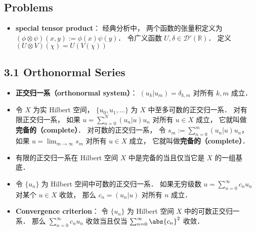 \subsection{Problems}
\begin{itemize}
\item \textbf{special tensor product}： 经典分析中， 两个函数的张量积定义为 $(\phi\otimes\psi)(x,y) := \phi(x)\psi(y)$． 令广义函数 $U, \delta \in \mathcal D'(\mathbb R)$． 定义 $(U\otimes V)(\chi) = U(V(\chi))$
\end{itemize}

\subsection{3.1 Orthonormal Series}
\begin{itemize}
\item \textbf{正交归一系（orthonormal system）}： $(u_k|u_m) = \delta_{k,m}$ 对所有 $k, m$ 成立．

\item 令 $X$ 为实 Hilbert 空间， $\{u_0, u_1,\dots\}$ 为 $X$ 中至多可数的正交归一系． 对有限正交归一系， 如果 $u = \sum_{n=0}^N(u_n|u)u_n$ 对所有 $u\in X$ 成立， 它就叫做\textbf{完备的（complete）}． 对可数的正交归一系， 令 $s_m := \sum_{n=0}^m(u_n|u)u_n$， 如果 $u = \lim_{m\to\infty} s_m$ 对所有 $u\in X$ 成立， 它就叫做\textbf{完备的（complete）}．

\item 有限的正交归一系在 Hilbert 空间 $X$ 中是完备的当且仅当它是 $X$ 的一组基底．

\item 令 $\{u_n\}$ 为 Hilbert 空间中可数的正交归一系． 如果无穷级数 $u = \sum_{n=0}^\infty c_n u_n$ 对某个 $u\in X$ 收敛， 那么 $c_n = (u_n|u)$ 对所有 $n$ 成立．

\item \textbf{Convergence criterion}： 令 $\{u_n\}$ 为 Hilbert 空间 $X$ 中的可数正交归一系． 那么 $\sum_{n=0}^\infty c_nu_n$ 收敛当且仅当 $\sum_{n=0}^\infty \abs{c_n}^2$ 收敛．
\end{itemize}

